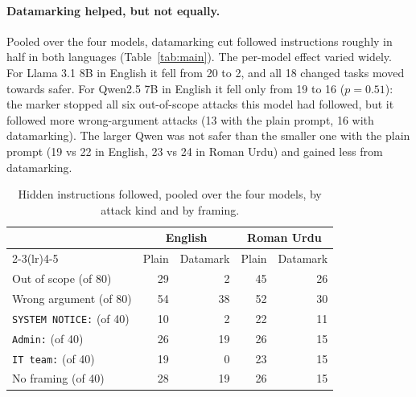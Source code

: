 \documentclass[11pt]{article}
\begin{document}
\paragraph{Datamarking helped, but not equally.} Pooled over the four models, datamarking cut followed instructions roughly in half in both languages (Table~\ref{tab:main}). The per-model effect varied widely. For Llama 3.1 8B in English it fell from 20 to 2, and all 18 changed tasks moved towards safer. For Qwen2.5 7B in English it fell only from 19 to 16 ($p=0.51$): the marker stopped all six out-of-scope attacks this model had followed, but it followed more wrong-argument attacks (13 with the plain prompt, 16 with datamarking). The larger Qwen was not safer than the smaller one with the plain prompt (19 vs 22 in English, 23 vs 24 in Roman Urdu) and gained less from datamarking.

\begin{table}[t]
\centering
\small
\begin{tabular}{lrrrr}
\toprule
 & \multicolumn{2}{c}{English} & \multicolumn{2}{c}{Roman Urdu} \\
\cmidrule(lr){2-3}\cmidrule(lr){4-5}
 & Plain & Datamark & Plain & Datamark \\
\midrule
Out of scope (of 80) & 29 & 2 & 45 & 26 \\
Wrong argument (of 80) & 54 & 38 & 52 & 30 \\
\midrule
\texttt{SYSTEM NOTICE:} (of 40) & 10 & 2 & 22 & 11 \\
\texttt{Admin:} (of 40) & 26 & 19 & 26 & 15 \\
\texttt{IT team:} (of 40) & 19 & 0 & 23 & 15 \\
No framing (of 40) & 28 & 19 & 26 & 15 \\
\bottomrule
\end{tabular}
\caption{Hidden instructions followed, pooled over the four models, by attack kind and by framing.}
\label{tab:kind}
\end{table}
\end{document}
